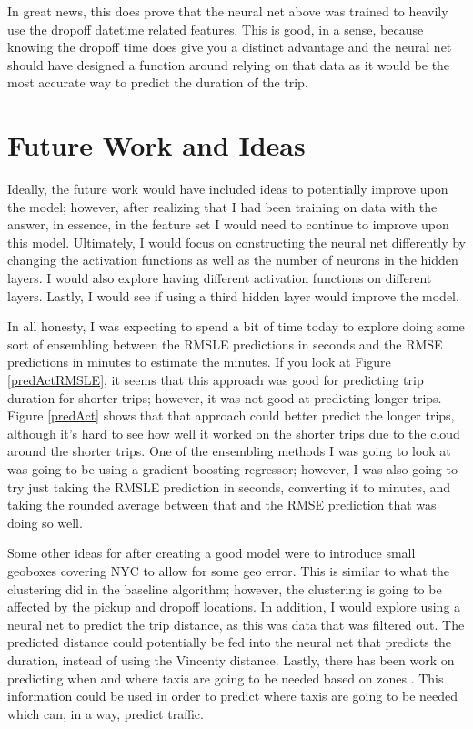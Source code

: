 \documentclass[conference]{IEEEtran}
\begin{document}
In great news, this does prove that the neural net above was trained to heavily use the dropoff datetime related features.  This is good, in a sense, because knowing the dropoff time does give you a distinct advantage and the neural net should have designed a function around relying on that data as it would be the most accurate way to predict the duration of the trip.



\section{Future Work and Ideas}
Ideally, the future work would have included ideas to potentially improve upon the model; however, after realizing that I had been training on data with the answer, in essence, in the feature set I would need to continue to improve upon this model.  Ultimately, I would focus on constructing the neural net differently by changing the activation functions as well as the number of neurons in the hidden layers.  I would also explore having different activation functions on different layers.  Lastly, I would see if using a third hidden layer would improve the model.

In all honesty, I was expecting to spend a bit of time today to explore doing some sort of ensembling between the RMSLE predictions in seconds and the RMSE predictions in minutes to estimate the minutes.  If you look at Figure \ref{predActRMSLE}, it seems that this approach was good for predicting trip duration for shorter trips; however, it was not good at predicting longer trips.  Figure \ref{predAct} shows that that approach could better predict the longer trips, although it's hard to see how well it worked on the shorter trips due to the cloud around the shorter trips.  One of the ensembling methods I was going to look at was going to be using a gradient boosting regressor; however, I was also going to try just taking the RMSLE prediction in seconds, converting it to minutes, and taking the rounded average between that and the RMSE prediction that was doing so well.

Some other ideas for after creating a good model were to introduce small geoboxes covering NYC to allow for some geo error.  This is similar to what the clustering did in the baseline algorithm; however, the clustering is going to be affected by the pickup and dropoff locations.  In addition, I would explore using a neural net to predict the trip distance, as this was data that was filtered out.  The predicted distance could potentially be fed into the neural net that predicts the duration, instead of using the Vincenty distance.  Lastly, there has been work on predicting when and where taxis are going to be needed based on zones \cite{blog}.  This information could be used in order to predict where taxis are going to be needed which can, in a way, predict traffic.
\end{document}
